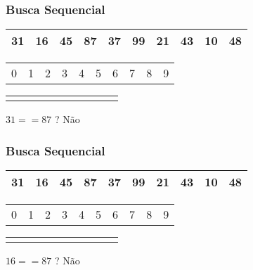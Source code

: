 \documentclass{beamer}
\begin{document}
\begin{frame}
    \frametitle{Busca Sequencial}
    \begin{center}
        \begin{table}
            \begin{tabular}{| p{0.25cm} | p{0.25cm} | p{0.25cm} | p{0.25cm} | p{0.25cm} | p{0.25cm} | p{0.25cm} | p{0.25cm} | p{0.25cm} | p{0.25cm} |}
                \hline
                31 & 16 & 45 & 87 & 37 & 99 & 21 & 43 & 10 & 48 \\ \hline
            \end{tabular}
            \begin{tabular}{p{0.25cm} p{0.25cm} p{0.25cm} p{0.25cm} p{0.25cm} p{0.25cm} p{0.25cm} p{0.25cm} p{0.25cm} p{0.25cm}}
                0 & 1 & 2 & 3 & 4 & 5 & 6 & 7 & 8 & 9
            \end{tabular}
            \begin{tabular}{p{0.25cm} p{0.25cm} p{0.25cm} p{0.25cm} p{0.25cm} p{0.25cm} p{0.25cm} p{0.25cm} p{0.25cm} p{0.25cm}}
                \color{red}{$\uparrow$} & & & & & & & & &
            \end{tabular}
        \end{table}

        $31 == 87$ ? Não
	\end{center}
\end{frame}

\begin{frame}
    \frametitle{Busca Sequencial}
    \begin{center}
        \begin{table}
            \begin{tabular}{| p{0.25cm} | p{0.25cm} | p{0.25cm} | p{0.25cm} | p{0.25cm} | p{0.25cm} | p{0.25cm} | p{0.25cm} | p{0.25cm} | p{0.25cm} |}
                \hline
                31 & 16 & 45 & 87 & 37 & 99 & 21 & 43 & 10 & 48 \\ \hline
            \end{tabular}
            \begin{tabular}{p{0.25cm} p{0.25cm} p{0.25cm} p{0.25cm} p{0.25cm} p{0.25cm} p{0.25cm} p{0.25cm} p{0.25cm} p{0.25cm}}
                0 & 1 & 2 & 3 & 4 & 5 & 6 & 7 & 8 & 9
            \end{tabular}
            \begin{tabular}{p{0.25cm} p{0.25cm} p{0.25cm} p{0.25cm} p{0.25cm} p{0.25cm} p{0.25cm} p{0.25cm} p{0.25cm} p{0.25cm}}
                 & \color{red}{$\uparrow$} & & & & & & & &
            \end{tabular}
        \end{table}

        $16 == 87$ ? Não
	\end{center}
\end{frame}
\end{document}
